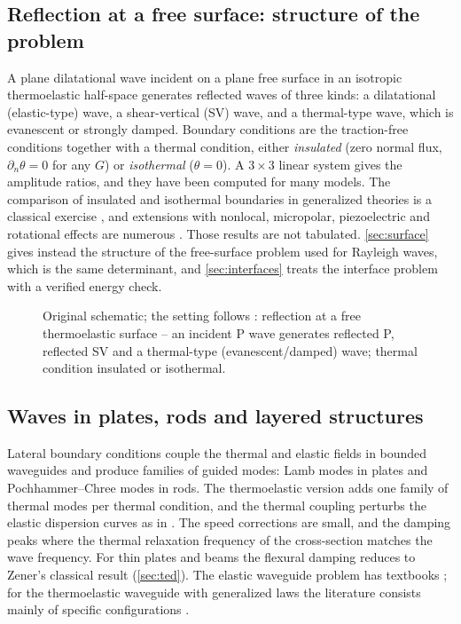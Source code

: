 \subsection{Reflection at a free surface: structure of the problem}
A plane dilatational wave incident on a plane free surface in an isotropic thermoelastic half-space generates reflected waves of three kinds: a dilatational (elastic-type) wave, a shear-vertical (SV) wave, and a thermal-type wave, which is evanescent or strongly damped. Boundary conditions are the traction-free conditions together with a thermal condition, either \emph{insulated} (zero normal flux, $\partial_n\theta=0$ for any $G$) or \emph{isothermal} ($\theta=0$). A $3\times3$ linear system gives the amplitude ratios, and they have been computed for many models. The comparison of insulated and isothermal boundaries in generalized theories is a classical exercise \citep{Das2008}, and extensions with nonlocal, micropolar, piezoelectric and rotational effects are numerous \citep{Kalkal2020,Singh2020b,Yadav2023,Gupta2024a}. Those results are not tabulated. \cref{sec:surface} gives instead the structure of the free-surface problem used for Rayleigh waves, which is the same determinant, and \cref{sec:interfaces} treats the interface problem with a verified energy check.

\begin{figure}[t!]\centering\small

\caption{Original schematic; the setting follows \citep{Das2008}: reflection at a free thermoelastic surface -- an incident P wave generates reflected P, reflected SV and a thermal-type (evanescent/damped) wave; thermal condition insulated or isothermal.}\label{fig:reflection-geo}
\end{figure}

\subsection{Waves in plates, rods and layered structures}
Lateral boundary conditions couple the thermal and elastic fields in bounded waveguides and produce families of guided modes: Lamb modes in plates \citep{Lamb1917} and Pochhammer--Chree modes in rods. The thermoelastic version adds one family of thermal modes per thermal condition, and the thermal coupling perturbs the elastic dispersion curves as in . The speed corrections are small, and the damping peaks where the thermal relaxation frequency of the cross-section matches the wave frequency. For thin plates and beams the flexural damping reduces to Zener's classical result (\cref{sec:ted}). The elastic waveguide problem has textbooks \citep{Achenbach1973,Auld1973}; for the thermoelastic waveguide with generalized laws the literature consists mainly of specific configurations \citep{Biswas2020,Abouelregal2023}.


